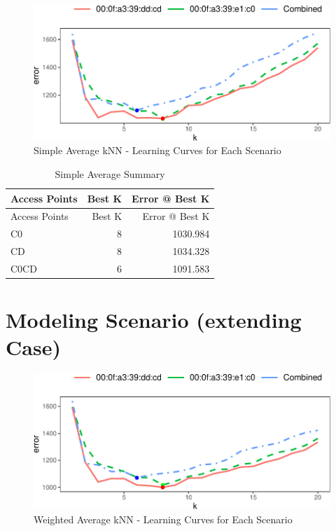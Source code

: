 \documentclass[
]{article}
\begin{document}
\begin{figure}[H]

{\centering \includegraphics{msds7333_case_study01_files/figure-latex/unnamed-chunk-11-1} 

}

\caption{Simple Average kNN - Learning Curves for Each Scenario}\label{fig:unnamed-chunk-11}
\end{figure}

\begin{longtable}[]{@{}lrr@{}}
\caption{Simple Average Summary}\tabularnewline
\toprule
Access Points & Best K & Error @ Best K\tabularnewline
\midrule
\endfirsthead
\toprule
Access Points & Best K & Error @ Best K\tabularnewline
\midrule
\endhead
C0 & 8 & 1030.984\tabularnewline
CD & 8 & 1034.328\tabularnewline
C0CD & 6 & 1091.583\tabularnewline
\bottomrule
\end{longtable}

\newpage

\hypertarget{modeling-scenario-extending-case}{%
\section{Modeling Scenario (extending
Case)}\label{modeling-scenario-extending-case}}

\begin{figure}[H]

{\centering \includegraphics{msds7333_case_study01_files/figure-latex/unnamed-chunk-13-1} 

}

\caption{Weighted Average kNN - Learning Curves for Each Scenario}\label{fig:unnamed-chunk-13}
\end{figure}
\end{document}
